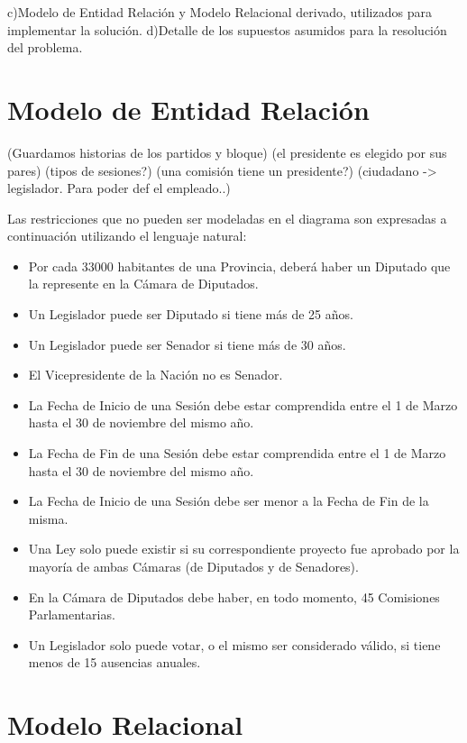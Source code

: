 c)Modelo de Entidad Relación y Modelo Relacional derivado, utilizados para implementar la solución.
d)Detalle de los supuestos asumidos para la resolución del problema.


\section{Modelo de Entidad Relación}

(Guardamos historias de los partidos y bloque)
(el presidente es elegido por sus pares)
(tipos de sesiones?)
(una comisión tiene un presidente?)
(ciudadano -> legislador. Para poder def el empleado..)



Las restricciones que no pueden ser modeladas en el diagrama son expresadas a continuación utilizando el lenguaje natural:
\begin{itemize}
	\item Por cada 33000 habitantes de una Provincia, deberá haber un Diputado que la represente en la Cámara de Diputados. 
	\item Un Legislador puede ser Diputado si tiene más de 25 años.
	\item Un Legislador puede ser Senador si tiene más de 30 años.
	\item El Vicepresidente de la Nación no es Senador.
	\item La Fecha de Inicio de una Sesión debe estar comprendida entre el 1 de Marzo hasta el 30 de noviembre del mismo año.	
	\item La Fecha de Fin de una Sesión debe estar comprendida entre el 1 de Marzo hasta el 30 de noviembre del mismo año.
	\item La Fecha de Inicio de una Sesión debe ser menor a la Fecha de Fin de la misma. 
	\item Una Ley solo puede existir si su correspondiente proyecto fue aprobado por la mayoría de ambas Cámaras (de Diputados y de Senadores).
	\item En la Cámara de Diputados debe haber, en todo momento, 45 Comisiones Parlamentarias.
	\item Un Legislador solo puede votar, o el mismo ser considerado válido, si tiene menos de 15 ausencias anuales.  

\end{itemize}

\section{Modelo Relacional}

